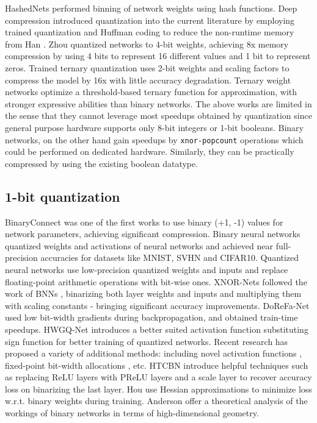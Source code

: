 \noindent HashedNets \cite{chen2015compressing} performed binning of network weights using hash functions. Deep compression \cite{han2015deep} introduced quantization into the current literature by employing trained quantization and Huffman coding to reduce the non-runtime memory from Han \etal \cite{han2015learning}. Zhou \etal \cite{zhou2017inq} quantized networks to 4-bit weights, achieving 8x memory compression by using 4 bits to represent 16 different values and 1 bit to represent zeros. Trained ternary quantization \cite{zhu2016trained} uses 2-bit weights and scaling factors to compress the model by 16x with little accuracy degradation.  Ternary weight networks \cite{li2016ternary} optimize a threshold-based ternary function for approximation, with stronger expressive abilities than binary networks.  The above works are limited in the sense that they cannot leverage most speedups obtained by quantization since general purpose hardware supports only 8-bit integers or 1-bit booleans. Binary networks, on the other hand gain speedups by \texttt{xnor-popcount} operations which could be performed on dedicated hardware. Similarly, they can be practically compressed by using the existing boolean datatype.

\subsection{1-bit quantization}

\noindent BinaryConnect \cite{courbariaux2015binaryconnect} was one of the first works to use binary (+1, -1) values for network parameters, achieving significant compression. Binary neural networks \cite{courbariaux2016binarized} quantized weights and activations of neural networks and achieved near full-precision accuracies for datasets like MNIST, SVHN and CIFAR10. Quantized neural networks\cite{hubara2017quantized} use low-precision quantized weights and inputs and replace floating-point arithmetic operations with bit-wise ones. XNOR-Nets \cite{rastegari2016xnor} followed the work of BNNs \cite{hubara2017quantized}, binarizing both layer weights and inputs and multiplying them with scaling constants - bringing significant accuracy improvements. DoReFa-Net \cite{zhou2016dorefa} used low bit-width gradients during backpropagation, and obtained train-time speedups. HWGQ-Net \cite{cai2017deep} introduces a better suited activation function substituting sign function for better training of quantized networks.  Recent research has proposed a variety of additional methods: including novel activation functions \cite{cai2017deep}, fixed-point bit-width allocations \cite{lin2016fixed}, etc. HTCBN \cite{tang2017train} introduce helpful techniques such as replacing ReLU layers with PReLU layers and a scale layer to recover accuracy loss on binarizing the last layer. Hou \etal \cite{hou2016loss} use Hessian approximations to minimize loss w.r.t. binary weights during training. Anderson \etal \cite{anderson2017high} offer a theoretical analysis of the workings of binary networks in terms of high-dimensional geometry.\\

